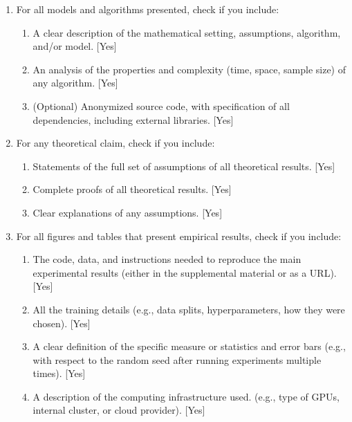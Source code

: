 \documentclass[twoside]{article}
\newcommand{\1}{{\mathbbm{1}}}
\begin{document}
 \begin{enumerate}


 \item For all models and algorithms presented, check if you include:
 \begin{enumerate}
   \item A clear description of the mathematical setting, assumptions, algorithm, and/or model. [Yes]
   \item An analysis of the properties and complexity (time, space, sample size) of any algorithm. [Yes]
   \item (Optional) Anonymized source code, with specification of all dependencies, including external libraries. [Yes]
 \end{enumerate}


 \item For any theoretical claim, check if you include:
 \begin{enumerate}
   \item Statements of the full set of assumptions of all theoretical results. [Yes]
   \item Complete proofs of all theoretical results. [Yes]
   \item Clear explanations of any assumptions. [Yes]     
 \end{enumerate}


 \item For all figures and tables that present empirical results, check if you include:
 \begin{enumerate}
   \item The code, data, and instructions needed to reproduce the main experimental results (either in the supplemental material or as a URL). [Yes]
   \item All the training details (e.g., data splits, hyperparameters, how they were chosen). [Yes]
         \item A clear definition of the specific measure or statistics and error bars (e.g., with respect to the random seed after running experiments multiple times). [Yes]
         \item A description of the computing infrastructure used. (e.g., type of GPUs, internal cluster, or cloud provider). [Yes]
 \end{enumerate}


\end{enumerate}
\end{document}
